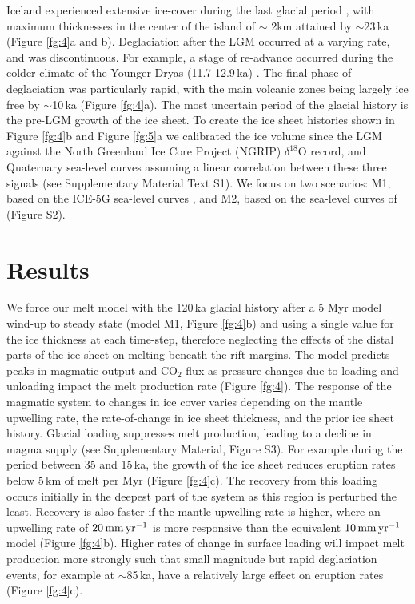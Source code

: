 \documentclass[draft,linenumbers]{agujournal2018}
\begin{document}
Iceland experienced extensive ice-cover during the last glacial period \citep{patton-etal-2017}, with maximum thicknesses in the center of the island of $\sim$ 2km attained by $\sim$23\,ka (Figure \ref{fg:4}a and b). Deglaciation after the LGM occurred at a varying rate, and was discontinuous. For example, a stage of re-advance occurred during the colder climate of the Younger Dryas (11.7-12.9\,ka) \citep{nordahl-2015}. The final phase of deglaciation was particularly rapid, with the main volcanic zones being largely ice free by $\sim$10\,ka (Figure \ref{fg:4}a). The most uncertain period of the glacial history is the pre-LGM growth of the ice sheet. To create the ice sheet histories shown in Figure \ref{fg:4}b and Figure \ref{fg:5}a we calibrated the ice volume since the LGM against the North Greenland Ice Core Project (NGRIP) $\delta^{18}$O record, and Quaternary sea-level curves assuming a linear correlation between these three signals (see Supplementary Material Text S1). We focus on two scenarios: M1, based on the ICE-5G sea-level curves \citep{peltier-2004}, and M2, based on the sea-level curves of \citet{pico-etal-2017} (Figure S2).

\section{Results}

We force our melt model with the 120\,ka glacial history after a 5 Myr model wind-up to steady state (model M1, Figure \ref{fg:4}b) and using a single value for the ice thickness at each time-step, therefore neglecting the effects of the distal parts of the ice sheet on melting beneath the rift margins. The model predicts peaks in magmatic output and CO$_{2}$ flux as pressure changes due to loading and unloading impact the melt production rate (Figure \ref{fg:4}). The response of the magmatic system to changes in ice cover varies depending on the mantle upwelling rate, the rate-of-change in ice sheet thickness, and the prior ice sheet history. Glacial loading suppresses melt production, leading to a decline in magma supply (see Supplementary Material, Figure S3). For example during the period between 35 and 15\,ka, the growth of the ice sheet reduces eruption rates below 5\,km of melt per Myr (Figure \ref{fg:4}c). The recovery from this loading occurs initially in the deepest part of the system as this region is perturbed the least. Recovery is also faster if the mantle upwelling rate is higher, where an upwelling rate of $20\rm\,mm\,yr^{-1}$ is more responsive than the equivalent $10\rm\,mm\,yr^{-1}$ model (Figure \ref{fg:4}b). Higher rates of change in surface loading will impact melt production more strongly such that small magnitude but rapid deglaciation events, for example at $\sim$85\,ka, have a relatively large effect on eruption rates (Figure \ref{fg:4}c).
\end{document}
